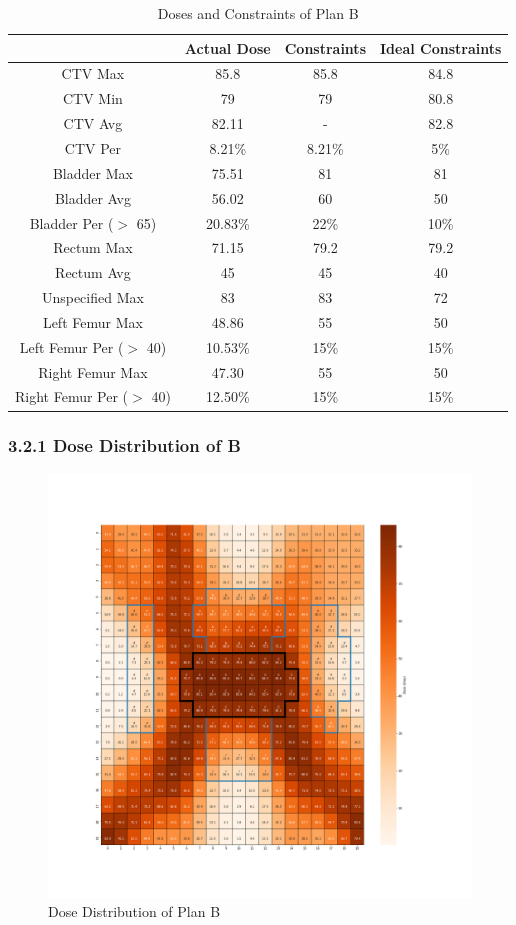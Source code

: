 \documentclass{report}
\begin{document}
\begin{table}[H]
\centering
\begin{tabular}{||c|c c c||} 
 \hline
  & Actual Dose & Constraints & Ideal Constraints \\ [0.5ex] 
 \hline
 CTV Max & 85.8 & 85.8 & 84.8 \\ 
 CTV Min & 79 & 79 & 80.8 \\
 CTV Avg & 82.11 & - & 82.8 \\
 CTV Per & 8.21\% & 8.21\% & 5\% \\
 \hline
 Bladder Max & 75.51 & 81 & 81 \\
 Bladder Avg & 56.02 & 60 & 50 \\
 Bladder Per ($>$ 65) & 20.83\% & 22\% & 10\% \\ 
 \hline
 Rectum Max & 71.15 & 79.2 & 79.2 \\ 
 Rectum Avg & 45 & 45 & 40 \\ 
 \hline
 Unspecified Max & 83 & 83 & 72 \\ 
 \hline
 Left Femur Max& 48.86 & 55 & 50 \\ 
 Left Femur Per ($>$ 40)& 10.53\% & 15\% & 15\% \\ 
 \hline
 Right Femur Max& 47.30 & 55 & 50 \\ 
 Right Femur Per ($>$ 40)& 12.50\% & 15\% & 15\% \\ 
 \hline
\end{tabular}
\caption{Doses and Constraints of Plan B}
\label{table:2}
\end{table}

\subsubsection{3.2.1 Dose Distribution of B}

\begin{figure}[H]
    \centering
    \includegraphics[width=0.95\columnwidth]{b-dose.png}
    \caption{Dose Distribution of Plan B}
    
\end{figure}
\end{document}
